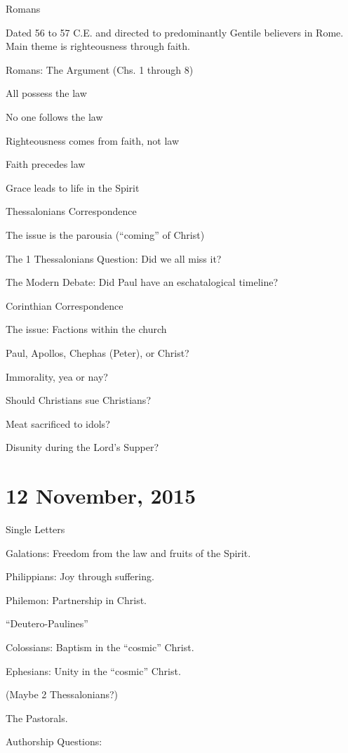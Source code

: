 \documentclass{article}
\begin{document}
    \centerline{Romans}

    Dated 56 to 57 C.E. and directed to predominantly Gentile believers in Rome. Main theme is righteousness through faith.

    Romans: The Argument (Chs. 1 through 8)

    All possess the law

    No one follows the law

    Righteousness comes from faith, not law

    Faith precedes law

    Grace leads to life in the Spirit

    \centerline{Thessalonians Correspondence}

    The issue is the parousia (``coming'' of Christ)

    The 1 Thessalonians Question: Did we all miss it?

    The Modern Debate: Did Paul have an eschatalogical timeline?

    \centerline{Corinthian Correspondence}

    The issue: Factions within the church

    Paul, Apollos, Chephas (Peter), or Christ?

    Immorality, yea or nay?

    Should Christians sue Christians?

    Meat sacrificed to idols?

    Disunity during the Lord's Supper?

    \section{12 November, 2015}

    \centerline{Single Letters}

    Galations: Freedom from the law and fruits of the Spirit.

    Philippians: Joy through suffering.

    Philemon: Partnership in Christ.

    \centerline{``Deutero-Paulines''}

    Colossians: Baptism in the ``cosmic'' Christ.

    Ephesians: Unity in the ``cosmic'' Christ.

    (Maybe 2 Thessalonians?)

    The Pastorals.

    Authorship Questions:
\end{document}
